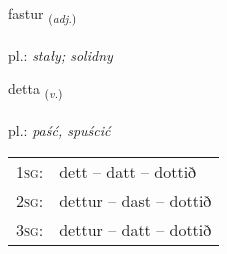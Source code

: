 \documentclass[frontgrid, backgrid]{flacards}\usepackage[]{graphicx}\usepackage[]{xcolor}
\begin{document}
\renewcommand{\blhead}{\vskip5pt {\small\bfseries\footnotesize Lýsingarorð | przymiotnik }}
\renewcommand{\bcfoot}{\vskip5pt \hspace{2pt}{\small\bfseries\footnotesize 1K}}


{fastur \small{\textsubscript{(\textit{adj.})}} \\[1ex] %
\textphonetic{[fastʏr]} \\
pl.: \emph{stały; solidny} \\  [2ex]
\renewcommand*{\arraystretch}{0.8}
}

\renewcommand{\flhead}{\vskip5pt \fboxsep=0pt {\small\bfseries\footnotesize Sagnorð | czasownik}}
\renewcommand{\fcfoot}{\vskip5pt \fboxsep=0pt \hspace{2pt}{\small\bfseries\footnotesize 1K}}

\renewcommand{\blhead}{\vskip5pt {\small\bfseries\footnotesize Sagnorð | czasownik }}
\renewcommand{\bcfoot}{\vskip5pt \hspace{2pt}{\small\bfseries\footnotesize 1K}}


{detta \small{\textsubscript{(\textit{v.})}} \\[1ex] %
\textphonetic{[tɛhta]} \\
pl.: \emph{paść, spuścić} \\  [2ex]
\renewcommand*{\arraystretch}{0.8}
\begin{tabular}{p{1cm}l}
\textsc{1sg}: & dett -- datt -- dottið \\ 
\textsc{2sg}: & dettur -- dast -- dottið \\ 
\textsc{3sg}: & dettur -- datt -- dottið \\ 
\end{tabular}
}
\end{document}
